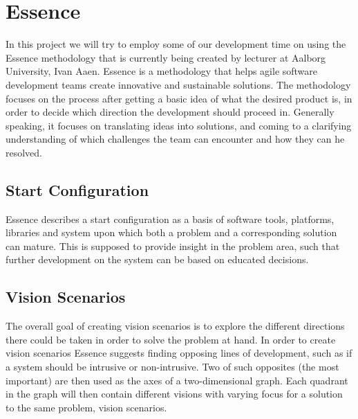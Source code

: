 
\section{Essence}
\label{sec:essence}
In this project we will try to employ some of our development time on using the Essence methodology that is currently being created by lecturer at Aalborg University, Ivan Aaen. Essence is a methodology that helps agile software development teams create innovative and sustainable solutions. The methodology focuses on the process after getting a basic idea of what the desired product is, in order to decide which direction the development should proceed in. Generally speaking, it focuses on translating ideas into solutions, and coming to a clarifying understanding of which challenges the team can encounter and how they can he resolved.  

\subsection{Start Configuration}
\label{sub:essence_start_configuration}

Essence describes a start configuration as a basis of software tools, platforms, libraries and system upon which both a problem and a corresponding solution can mature. This is supposed to provide insight in the problem area, such that further development on the system can be based on educated decisions. 

\subsection{Vision Scenarios}
\label{sub:essence_vision_scenarios}

The overall goal of creating vision scenarios is to explore the different directions there could be taken in order to solve the problem at hand. In order to create vision scenarios Essence suggests finding opposing lines of development, such as if a system should be intrusive or non-intrusive. Two of such opposites (the most important) are then used as the axes of a two-dimensional graph. Each quadrant in the graph will then contain different visions with varying focus for a solution to the same problem, vision scenarios.


